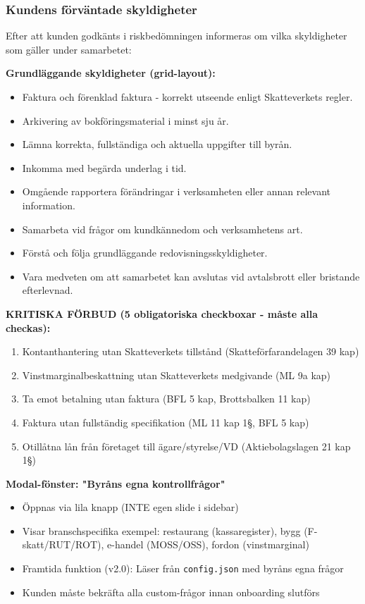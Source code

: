 \documentclass[10pt]{beamer}
\begin{document}
% 
% 
\begin{frame}[label=skyldigheter]
  \frametitle{Kundens förväntade skyldigheter}
  \small
  Efter att kunden godkänts i riskbedömningen informeras om vilka skyldigheter som gäller under samarbetet:
  
  \textbf{Grundläggande skyldigheter (grid-layout):}
  \begin{itemize}
    \item Faktura och förenklad faktura - korrekt utseende enligt Skatteverkets regler.
    \item Arkivering av bokföringsmaterial i minst sju år.
    \item Lämna korrekta, fullständiga och aktuella uppgifter till byrån.
    \item Inkomma med begärda underlag i tid.
    \item Omgående rapportera förändringar i verksamheten eller annan relevant information.
    \item Samarbeta vid frågor om kundkännedom och verksamhetens art.
    \item Förstå och följa grundläggande redovisningsskyldigheter.
    \item Vara medveten om att samarbetet kan avslutas vid avtalsbrott eller bristande efterlevnad.
  \end{itemize}
  
  \vspace{0.3cm}
  \textbf{KRITISKA FÖRBUD (5 obligatoriska checkboxar - måste alla checkas):}
  \begin{enumerate}
    \item Kontanthantering utan Skatteverkets tillstånd (Skatteförfarandelagen 39 kap)
    \item Vinstmarginalbeskattning utan Skatteverkets medgivande (ML 9a kap)
    \item Ta emot betalning utan faktura (BFL 5 kap, Brottsbalken 11 kap)
    \item Faktura utan fullständig specifikation (ML 11 kap 1§, BFL 5 kap)
    \item Otillåtna lån från företaget till ägare/styrelse/VD (Aktiebolagslagen 21 kap 1§)
  \end{enumerate}
  
  \vspace{0.3cm}
  \textbf{Modal-fönster: "Byråns egna kontrollfrågor"}
  \begin{itemize}
    \item Öppnas via lila knapp (INTE egen slide i sidebar)
    \item Visar branschspecifika exempel: restaurang (kassaregister), bygg (F-skatt/RUT/ROT), e-handel (MOSS/OSS), fordon (vinstmarginal)
    \item Framtida funktion (v2.0): Läser från \texttt{config.json} med byråns egna frågor
    \item Kunden måste bekräfta alla custom-frågor innan onboarding slutförs
  \end{itemize}
  

\end{frame}
\end{document}
